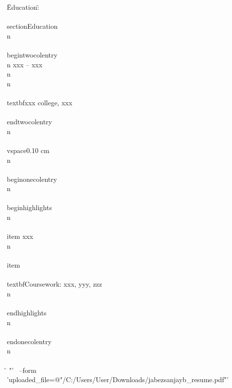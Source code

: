 {\"Education\": \"\\\\section{Education}\\n        \\\\begin{twocolentry}{\\n            xxx – xxx\\n        }\\n            \\\\textbf{xxx} college, xxx\\\\end{twocolentry}\\n        \\\\vspace{0.10 cm}\\n        \\\\begin{onecolentry}\\n            \\\\begin{highlights}\\n                \\\\item xxx \\n                \\\\item \\\\textbf{Coursework:} xxx, yyy, zzz\\n            \\\\end{highlights}\\n        \\\\end{onecolentry}\\n\\\\\n\"
}
"' \
--form 'uploaded_file=@"/C:/Users/User/Downloads/jabezsanjayb_resume.pdf"'